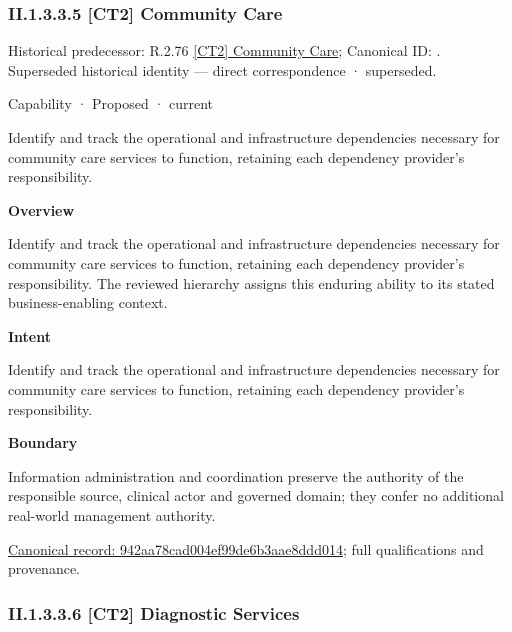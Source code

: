 \subsubsection*{II.1.3.3.5 [CT2] Community Care}
\label{navigation:II.1.3.3.5}

{\small Historical predecessor: R.2.76 \hyperref[element:4b7177f3f40449518fba381acae6ba1e]{[CT2] Community Care}; Canonical ID: \texttt{}. Superseded historical identity — direct correspondence · superseded.}\par
\label{element:942aa78cad004ef99de6b3aae8ddd014}
{\small Capability · Proposed · current}\par

Identify and track the operational and infrastructure dependencies necessary for community care services to function, retaining each dependency provider's responsibility.



\textbf{Overview}



Identify and track the operational and infrastructure dependencies necessary for community care services to function, retaining each dependency provider's responsibility. The reviewed hierarchy assigns this enduring ability to its stated business-enabling context.



\textbf{Intent}



Identify and track the operational and infrastructure dependencies necessary for community care services to function, retaining each dependency provider's responsibility.



\textbf{Boundary}



Information administration and coordination preserve the authority of the responsible source, clinical actor and governed domain; they confer no additional real-world management authority.


{\footnotesize \href{../../../../../../../continuum/strategy/capability/942aa78cad004ef99de6b3aae8ddd014.md}{Canonical record: 942aa78cad004ef99de6b3aae8ddd014}; full qualifications and provenance.}\par
\subsubsection*{II.1.3.3.6 [CT2] Diagnostic Services}
\label{navigation:II.1.3.3.6}


